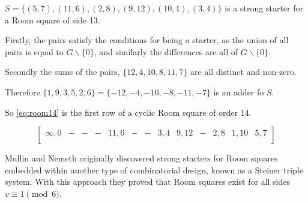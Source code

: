 \begin{example}

$S = \{(5, 7), (11, 6), (2, 8), (9, 12), (10, 1), (3, 4)\}$
is a strong starter for a Room square of side 13.

Firstly, the pairs satisfy the conditions for being a starter, as the union of all pairs is equal to $G \backslash \{0\}$, and similarly the differences are all of $G\backslash \{0\}$.

Secondly the sums of the pairs, $\{12, 4, 10, 8, 11, 7\}$ are all distinct and non-zero.

Therefore 
$\{1, 9, 3, 5, 2, 6\} = \{-12, -4, -10, -8, -11, -7\}$
is an adder fo $S$.

So \eqref{eq:room14} is the first row of a cyclic Room square of order 14.

\begin{equation}
  \label{eq:room14}
  \begin{bmatrix}
    \infty, 0 & - & - & - & 11,6 & - & - & 3,4 & 9,12 & - & 2,8 & 1,10 & 5,7 \\
  \end{bmatrix}
\end{equation}

\end{example}

Mullin and Nemeth originally discovered strong starters for Room squares embedded within another type of combinatorial design, known as a Steiner triple system.
With this approach they proved that Room squares exist for all sides $v \equiv 1 \pmod 6$.

